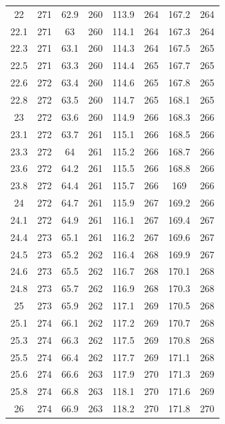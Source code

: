 \documentclass[12pt]{ctexart}
\numberwithin{equation}{section}
\begin{document}
\begin{longtable}{cc|cc|cc|cc}
22  &  271  &  62.9  &  260  &  113.9  &  264  &  167.2  &  264  \\
22.1  &  271  &  63  &  260  &  114.1  &  264  &  167.3  &  264  \\
22.3  &  271  &  63.1  &  260  &  114.3  &  264  &  167.5  &  265  \\
22.5  &  271  &  63.3  &  260  &  114.4  &  265  &  167.7  &  265  \\
22.6  &  272  &  63.4  &  260  &  114.6  &  265  &  167.8  &  265  \\
22.8  &  272  &  63.5  &  260  &  114.7  &  265  &  168.1  &  265  \\
23  &  272  &  63.6  &  260  &  114.9  &  266  &  168.3  &  266  \\
23.1  &  272  &  63.7  &  261  &  115.1  &  266  &  168.5  &  266  \\
23.3  &  272  &  64  &  261  &  115.2  &  266  &  168.7  &  266  \\
23.6  &  272  &  64.2  &  261  &  115.5  &  266  &  168.8  &  266  \\
23.8  &  272  &  64.4  &  261  &  115.7  &  266  &  169  &  266  \\
24  &  272  &  64.7  &  261  &  115.9  &  267  &  169.2  &  266  \\
24.1  &  272  &  64.9  &  261  &  116.1  &  267  &  169.4  &  267  \\
24.4  &  273  &  65.1  &  261  &  116.2  &  267  &  169.6  &  267  \\
24.5  &  273  &  65.2  &  262  &  116.4  &  268  &  169.9  &  267  \\
24.6  &  273  &  65.5  &  262  &  116.7  &  268  &  170.1  &  268  \\
24.8  &  273  &  65.7  &  262  &  116.9  &  268  &  170.3  &  268  \\
25  &  273  &  65.9  &  262  &  117.1  &  269  &  170.5  &  268  \\
25.1  &  274  &  66.1  &  262  &  117.2  &  269  &  170.7  &  268  \\
25.3  &  274  &  66.3  &  262  &  117.5  &  269  &  170.8  &  268  \\
25.5  &  274  &  66.4  &  262  &  117.7  &  269  &  171.1  &  268  \\
25.6  &  274  &  66.6  &  263  &  117.9  &  270  &  171.3  &  269  \\
25.8  &  274  &  66.8  &  263  &  118.1  &  270  &  171.6  &  269  \\
26  &  274  &  66.9  &  263  &  118.2  &  270  &  171.8  &  270  \\

\end{longtable}
\end{document}
